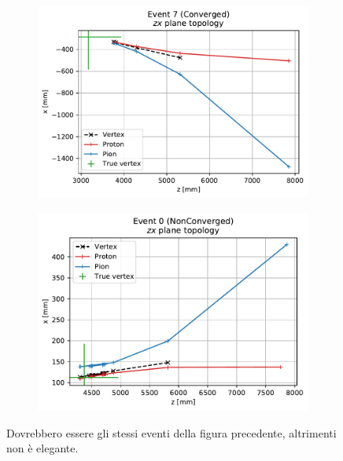 \begin{figure}[t]
	\centering
	\begin{subfigure}{.45\textwidth}
		\includegraphics[width=\textwidth]{graphics/03-vertex_reconstruction/evt_converged_zx_iter.pdf}
		\caption{}
		\label{fig:zx_iter_conv}
	\end{subfigure}
	\begin{subfigure}{.45\textwidth}
		\includegraphics[width=\textwidth]{graphics/03-vertex_reconstruction/evt_failed_zx_iter.pdf}
		\caption{}
		\label{fig:zx_iter_failed}
	\end{subfigure}
	\caption[A and b.]{Dovrebbero essere gli stessi eventi della figura precedente, altrimenti non è elegante.}
	\label{fig:zx_iter_conv_vs_failed}
\end{figure}



